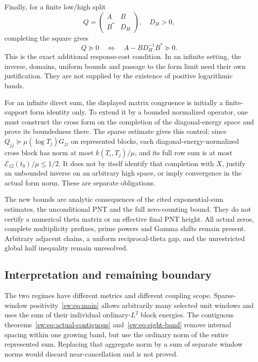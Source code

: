 \documentclass[11pt,a4paper]{article}
\numberwithin{equation}{section}
\theoremstyle{definition}\newtheorem{definition}[theorem]{Definition}
\theoremstyle{remark}\newtheorem{remark}[theorem]{Remark}
\begin{document}
Finally, for a finite low/high split
\begin{equation}
 Q=\begin{pmatrix}A&B\\B^*&D_H\end{pmatrix},\quad D_H>0,
\end{equation}
completing the square gives
\begin{equation}
 Q\succeq0\quad\Longleftrightarrow\quad A-BD_H^{-1}B^*\succeq0.
\end{equation}
This is the exact additional response-cost condition. In an infinite setting, the inverse, domains, uniform bounds and passage to the form limit need their own justification. They are not supplied by the existence of positive logarithmic bands.


For an infinite direct sum, the displayed matrix congruence is initially a finite-support form identity only. To extend it by a bounded normalized operator, one must construct the cross form on the completion of the diagonal-energy space and prove its boundedness there. The sparse estimate gives this control: since $Q_{jj}\succeq\mu(\log T_j)G_{jj}$ on represented blocks, each diagonal-energy-normalized cross block has norm at most $k(T_i,T_j)/\mu$, and its full row sum is at most $\mathcal E_{12}(t_0)/\mu\le1/2$. It does not by itself identify that completion with $X$, justify an unbounded inverse on an arbitrary high space, or imply convergence in the actual form norm. These are separate obligations.

The new bounds are analytic consequences of the cited exponential-sum estimates, the unconditional PNT and the full zero-counting bound. They do not certify a numerical theta matrix or an effective final PNT height. All actual zeros, complete multiplicity prefixes, prime powers and Gamma shifts remain present. Arbitrary adjacent chains, a uniform reciprocal-theta gap, and the unrestricted global half inequality remain unresolved.

\subsection{Interpretation and remaining boundary}\label{sw:sec:limits}
The two regimes have different metrics and different coupling scope. Sparse-window positivity~\eqref{sw:eq:main} allows arbitrarily many selected unit windows and uses the sum of their individual ordinary-$L^2$ block energies. The contiguous theorems~\eqref{sw:eq:actual-contiguous} and~\eqref{sw:eq:eight-band} remove internal spacing within one growing band, but use the ordinary norm of the entire represented sum. Replacing that aggregate norm by a sum of separate window norms would discard near-cancellation and is not proved.
\end{document}
